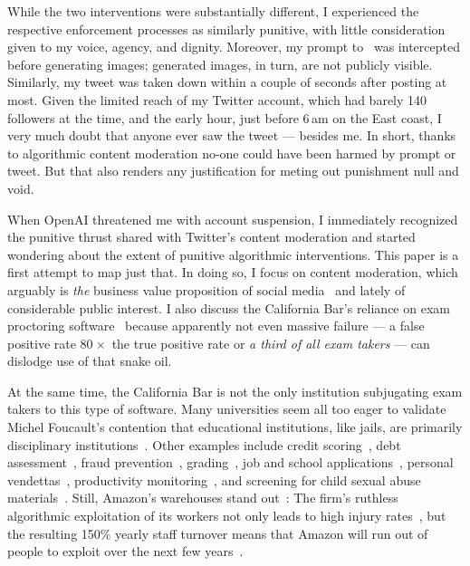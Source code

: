 While the two interventions were substantially different, I experienced the
respective enforcement processes as similarly punitive, with little
consideration given to my voice, agency, and dignity. Moreover, my prompt to
\DALLE\ was intercepted before generating images; generated images, in turn, are
not publicly visible. Similarly, my tweet was taken down within a couple of
seconds after posting at most. Given the limited reach of my Twitter account,
which had barely 140 followers at the time, and the early hour, just before
6$\,$am on the East coast, I very much doubt that anyone ever saw the tweet ---
besides me. In short, thanks to algorithmic content moderation no-one could have
been harmed by prompt or tweet. But that also renders any justification for
meting out punishment null and void.

When OpenAI threatened me with account suspension, I immediately recognized the
punitive thrust shared with Twitter's content moderation and started wondering
about the extent of punitive algorithmic interventions. This paper is a first
attempt to map just that. In doing so, I focus on content moderation, which
arguably is \emph{the} business value proposition of social
media~\cite{Masnick2022a,Patel2022a} and lately of considerable public interest.
I also discuss the California Bar's reliance on exam proctoring
software~\cite{FrancisWard2021b} because apparently not even massive failure ---
a false positive rate 80$\mspace{1mu}\times$ the true positive rate or \emph{a
third of all exam takers} --- can dislodge use of that \AI{} snake oil.

At the same time, the California Bar is not the only institution subjugating
exam takers to this type of software. Many universities seem all too eager to
validate Michel Foucault's contention that educational institutions, like jails,
are primarily disciplinary institutions~\cite{Foucault1979}. Other examples
include credit scoring~\cite{Anonymous2018}, debt
assessment~\cite{Yampolskiy2015}, fraud prevention~\cite{Kugel2022},
grading~\cite{Lam2020}, job and school
applications~\cite{Anonymous2016,Hall2012,Hall2020a,Stockton2020}, personal
vendettas~\cite{Casovan2022}, productivity
monitoring~\cite{Covert2022,KantorSundaramea2022,Rosenblat2018}, and screening
for child sexual abuse materials~\cite{Atherton2022a}. Still, Amazon's
warehouses stand out~\cite{KantorWeiseea2021,Lennard2020}: The firm's ruthless
algorithmic exploitation of its workers not only leads to high injury
rates~\cite{Brown2019a,Clark2023,Sainato2021}, but the resulting 150\% yearly
staff turnover means that Amazon will run out of people to exploit over the next
few years~\cite{Sainato2022}.

